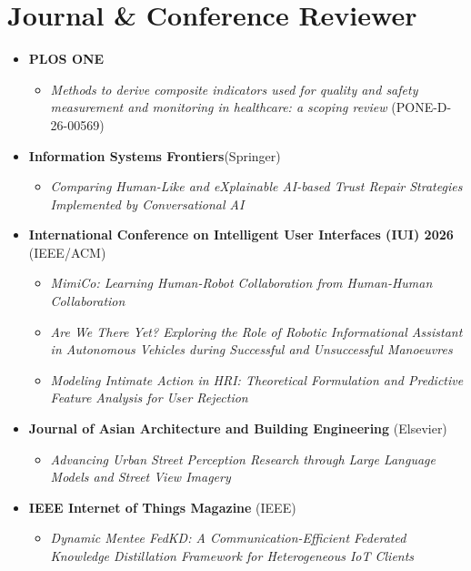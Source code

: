 \documentclass[10pt, letterpaper]{article}
\begin{document}
\section*{Journal \& Conference Reviewer}
\small
\begin{itemize}

\item \textbf{PLOS ONE}
\begin{itemize}
    \item \textit{Methods to derive composite indicators used for quality and safety measurement and monitoring in healthcare: a scoping review} (PONE-D-26-00569)
\end{itemize}

    \item \textbf{Information Systems Frontiers}(Springer)
\begin{itemize}
    \item \textit{Comparing Human-Like and eXplainable AI-based Trust Repair Strategies Implemented by Conversational AI}
\end{itemize}



    


    
\item \textbf{International Conference on Intelligent User Interfaces (IUI) 2026 } (IEEE/ACM)
\begin{itemize}
    \item \textit{MimiCo: Learning Human-Robot Collaboration from Human-Human Collaboration}
    \item \textit{Are We There Yet? Exploring the Role of Robotic Informational Assistant in Autonomous Vehicles during Successful and Unsuccessful Manoeuvres}
    \item \textit{Modeling Intimate Action in HRI: Theoretical Formulation and Predictive Feature Analysis for User Rejection}
\end{itemize}

\item \textbf{Journal of Asian Architecture and Building Engineering }(Elsevier)
\begin{itemize}
    \item \textit{Advancing Urban Street Perception Research through Large Language Models and Street View Imagery}
\end{itemize}

\item \textbf{IEEE Internet of Things Magazine } (IEEE)
\begin{itemize}
    \item \textit{Dynamic Mentee FedKD: A Communication-Efficient Federated Knowledge Distillation Framework for Heterogeneous IoT Clients}
\end{itemize}





\end{itemize}
\end{document}
